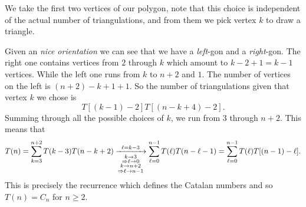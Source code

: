 \documentclass[12pt]{memoir}
\begin{document}
\begin{ptcbr}
\begin{center}
\begin{tikzpicture}[x=0.75pt,y=0.75pt,yscale=-1,xscale=1]
         
         \end{tikzpicture}
         \end{center} 
      We take the first two vertices of our polygon, note that this choice is independent of the actual number of triangulations, and from them we pick vertex $k$ to draw a triangle.\par 
      Given an \emph{nice orientation} we can see that we have a \emph{left}-gon and a \emph{right}-gon. The right one contains vertices from $2$ through $k$ which amount to $k-2+1=k-1$ vertices. While the left one runs from $k$ to $n+2$ and $1$. The number of vertices on the left is $(n+2)-k+1+1$. So the number of triangulations given that vertex $k$ we chose is 
      $$T[(k-1)-2]T[(n-k+4)-2].$$
      Summing through all the possible choices of $k$, we run from $3$ through $n+2$. This means that 
      $$T(n)=\sum_{k=3}^{n+2}T(k-3)T(n-k+2)\xrightarrow[\substack{k\to 3\\\To\l\to 0\\k\to n+2\\\To\l\to n-1}]{\l=k-3}\sum_{\l=0}^{n-1}T(\l)T(n-\l-1)=\sum_{\l=0}^{n-1}T(\l)T[(n-1)-\l].$$ 
      This is precisely the recurrence which defines the Catalan numbers and so $T(n)=C_n$ for $n\geq 2$.
      \end{ptcbr}
\end{document}
